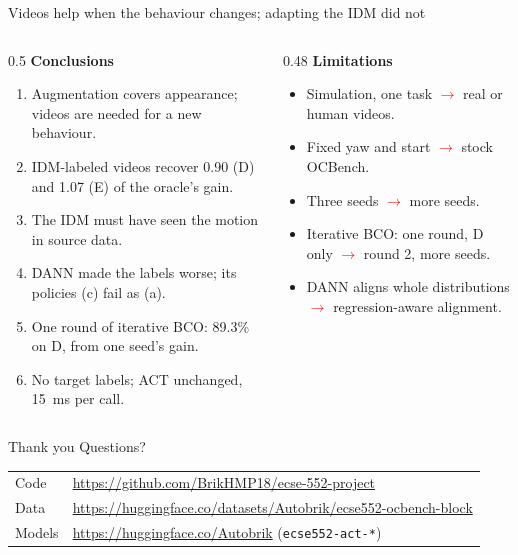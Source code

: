 \documentclass[aspectratio=169,11pt]{beamer}
\def\topicname{}
\newcommand{\topic}[1]{\gdef\topicname{#1}}
\newcommand{\fix}{\textcolor{red}{$\rightarrow$}}
\begin{document}
\begin{frame}{Videos help when the behaviour changes; adapting the IDM did not}
  \begin{columns}[T]
    \begin{column}{0.5\textwidth}
      \textbf{Conclusions}
      \begin{enumerate}
        \footnotesize
        \item Augmentation covers appearance; videos are needed for a new behaviour.
        \item IDM-labeled videos recover 0.90 (D) and 1.07 (E) of the oracle's gain.
        \item The IDM must have seen the motion in source data.
        \item DANN made the labels worse; its policies (c) fail as (a).
        \item One round of iterative BCO: 89.3\% on D, from one seed's gain.
        \item No target labels; ACT unchanged, 15~ms per call.
      \end{enumerate}
    \end{column}
    \begin{column}{0.48\textwidth}
      \textbf{Limitations}
      \begin{itemize}
        \footnotesize
        \item Simulation, one task \fix{} real or human videos.
        \item Fixed yaw and start \fix{} stock OCBench.
        \item Three seeds \fix{} more seeds.
        \item Iterative BCO: one round, D only \fix{} round 2, more seeds.
        \item DANN aligns whole distributions \fix{} regression-aware alignment.
      \end{itemize}
    \end{column}
  \end{columns}
\end{frame}

\topic{Questions}
\begin{frame}{Thank you}
  \centering
  \vspace{1.2em}
  {\Huge Questions?}
  \vspace{2em}

  \raggedright\small
  \begin{tabular}{@{}ll@{}}
    Code & \url{https://github.com/BrikHMP18/ecse-552-project} \\
    Data & \url{https://huggingface.co/datasets/Autobrik/ecse552-ocbench-block} \\
    Models & \url{https://huggingface.co/Autobrik} (\texttt{ecse552-act-*}) \\
  \end{tabular}
\end{frame}
\end{document}
